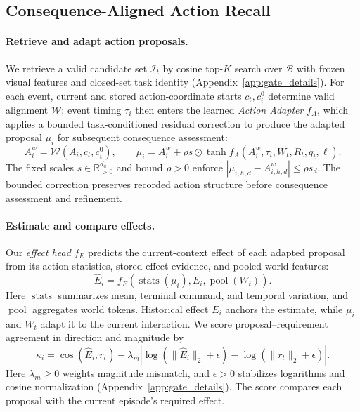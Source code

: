 \subsection{Consequence-Aligned Action Recall}
\label{sec:compatibility}

\paragraph{Retrieve and adapt action proposals.}
We retrieve a valid candidate set $\mathcal I_t$ by cosine top-$K$ search over $\mathcal B$ with frozen visual features and closed-set task identity (Appendix~\ref{app:gate_details}).
For each event, current and stored action-coordinate starts $c_t,c_i^0$ determine valid alignment $\mathcal W$; event timing $\tau_i$ then enters the learned \textit{Action Adapter} $f_A$, which applies a bounded task-conditioned residual correction to produce the adapted proposal $\mu_i$ for subsequent consequence assessment:
\begin{equation}
 A_i^w=\mathcal W(A_i,c_t,c_i^0),\qquad
 \mu_i=A_i^w+\rho s\odot\tanh f_A(A_i^w,\tau_i,W_t,R_t,q_t,\ell).
 \label{eq:adapter}
\end{equation}
The fixed scales $s\in\mathbb R_{>0}^{d_a}$ and bound $\rho>0$ enforce $|\mu_{i,h,d}-A^w_{i,h,d}|\leq\rho s_d$.
The bounded correction preserves recorded action structure before consequence assessment and refinement.

\paragraph{Estimate and compare effects.}
Our \emph{effect head} $f_E$ predicts the current-context effect of each adapted proposal from its action statistics, stored effect evidence, and pooled world features:
\begin{equation}
 \widehat E_i=f_E\!\left(\operatorname{stats}(\mu_i),E_i,\operatorname{pool}(W_t)\right).
 \label{eq:effect}
\end{equation}
Here $\operatorname{stats}$ summarizes mean, terminal command, and temporal variation, and $\operatorname{pool}$ aggregates world tokens.
Historical effect $E_i$ anchors the estimate, while $\mu_i$ and $W_t$ adapt it to the current interaction.
We score proposal--requirement agreement in direction and magnitude by
\begin{equation}
 \kappa_i=\cos(\widehat E_i,r_t)-\lambda_m
 \left|\log(\|\widehat E_i\|_2+\epsilon)-\log(\|r_t\|_2+\epsilon)\right|.
 \label{eq:kappa}
\end{equation}
Here $\lambda_m\geq0$ weights magnitude mismatch, and $\epsilon>0$ stabilizes logarithms and cosine normalization (Appendix~\ref{app:gate_details}).
The score compares each proposal with the current episode's required effect.

